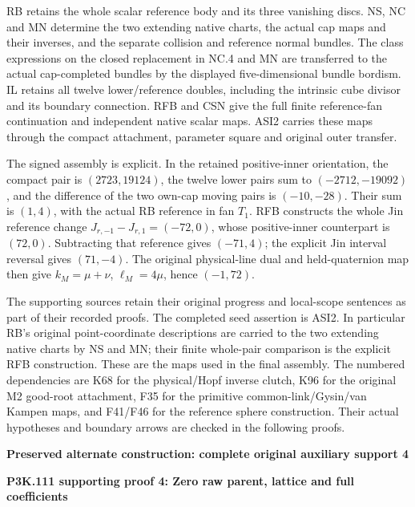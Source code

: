 RB retains the whole scalar reference body and its three vanishing discs.
NS, NC and MN determine the two extending native charts, the actual cap
maps and their inverses, and the separate collision and reference normal
bundles. The class expressions on the closed replacement in NC.4 and MN
are transferred to the actual cap-completed bundles by the displayed
five-dimensional bundle bordism. IL retains all twelve lower/reference
doubles, including the intrinsic cube divisor and its boundary connection.
RFB and CSN give the full finite reference-fan continuation and independent
native scalar maps. ASI2 carries these maps through the compact attachment,
parameter square and original outer transfer.

The signed assembly is explicit. In the retained positive-inner
orientation, the compact pair is \((2723,19124)\), the twelve lower
pairs sum to \((-2712,-19092)\), and the difference of the two own-cap
moving pairs is \((-10,-28)\). Their sum is \((1,4)\), with the actual
RB reference in fan \(T_1\). RFB constructs the whole Jin reference
change \(J_{r,-1}-J_{r,1}=(-72,0)\), whose positive-inner counterpart
is \((72,0)\). Subtracting that reference gives \((-71,4)\); the
explicit Jin interval reversal gives \((71,-4)\). The original
physical-line dual and held-quaternion map then give
\(k_M=\mu+\nu\), \(\ell_M=4\mu\), hence \((-1,72)\).

The supporting sources retain their original progress and local-scope
sentences as part of their recorded proofs. The completed seed assertion
is ASI2. In particular RB's original point-coordinate descriptions are
carried to the two extending native charts by NS and MN; their finite
whole-pair comparison is the explicit RFB construction. These are the
maps used in the final assembly. The numbered dependencies are K68 for
the physical/Hopf inverse clutch, K96 for the original M2 good-root
attachment, F35 for the primitive common-link/Gysin/van Kampen maps,
and F41/F46 for the reference sphere construction. Their actual
hypotheses and boundary arrows are checked in the following proofs.




\par\bigskip\noindent\textbf{Preserved alternate construction: complete original auxiliary support 4}\par
\par\bigskip\noindent\textbf{P3K.111 supporting proof 4: Zero raw parent, lattice and full coefficients}\par\nobreak
\par

